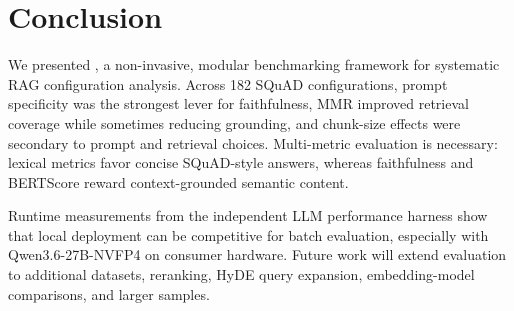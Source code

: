 \section{Conclusion}
\label{sec:conclusion}

We presented \toolname{}, a non-invasive, modular benchmarking framework for systematic RAG configuration analysis. Across 182 SQuAD configurations, prompt specificity was the strongest lever for faithfulness, MMR improved retrieval coverage while sometimes reducing grounding, and chunk-size effects were secondary to prompt and retrieval choices. Multi-metric evaluation is necessary: lexical metrics favor concise SQuAD-style answers, whereas faithfulness and BERTScore reward context-grounded semantic content.

Runtime measurements from the independent LLM performance harness show that local deployment can be competitive for batch evaluation, especially with Qwen3.6-27B-NVFP4 on consumer hardware. Future work will extend evaluation to additional datasets, reranking, HyDE query expansion, embedding-model comparisons, and larger samples.


